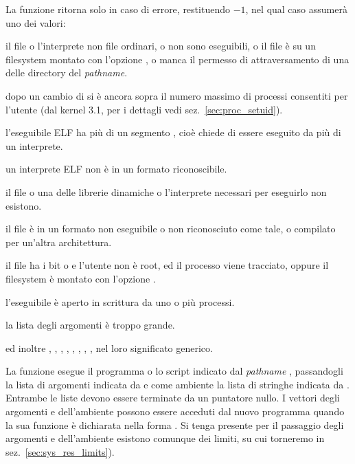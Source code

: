 \begin{funcproto}{
}
{La funzione ritorna solo in caso di errore, restituendo $-1$, nel qual
 caso  assumerà uno dei valori:
\begin{errlist}
  \item[\errcode{EACCES}] il file o l'interprete non file ordinari, o non sono
    eseguibili, o il file è su un filesystem montato con l'opzione
    , o manca  il permesso di attraversamento di una delle
    directory del \textit{pathname}.
  \item[\errcode{EAGAIN}] dopo un cambio di  si è ancora  sopra il
    numero massimo di processi consentiti per l'utente (dal kernel 3.1, per i
    dettagli vedi sez.~\ref{sec:proc_setuid}).
  \item[\errcode{EINVAL}] l'eseguibile ELF ha più di un segmento
    , cioè chiede di essere eseguito da più di un
    interprete.
  \item[\errcode{ELIBBAD}] un interprete ELF non è in un formato
    riconoscibile.
  \item[\errcode{ENOENT}] il file o una delle librerie dinamiche o l'interprete
    necessari per eseguirlo non esistono.
  \item[\errcode{ENOEXEC}] il file è in un formato non eseguibile o non
    riconosciuto come tale, o compilato per un'altra architettura.
  \item[\errcode{EPERM}] il file ha i bit  o  e l'utente
    non è root, ed il processo viene tracciato, oppure il filesystem è montato
    con l'opzione . 
  \item[\errcode{ETXTBSY}] l'eseguibile è aperto in scrittura da uno o più
    processi. 
  \item[\errcode{E2BIG}] la lista degli argomenti è troppo grande.
  \end{errlist}
  ed inoltre , , , ,
  , , , ,
   nel loro significato generico.  }
\end{funcproto}

La funzione  esegue il programma o lo script indicato dal
\textit{pathname} , passandogli la lista di argomenti indicata
da  e come ambiente la lista di stringhe indicata
da . Entrambe le liste devono essere terminate da un puntatore
nullo. I vettori degli argomenti e dell'ambiente possono essere acceduti dal
nuovo programma quando la sua funzione  è dichiarata nella forma
. Si tenga presente per il
passaggio degli argomenti e dell'ambiente esistono comunque dei limiti, su cui
torneremo in sez.~\ref{sec:sys_res_limits}).

